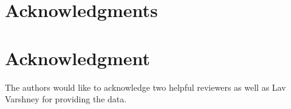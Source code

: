 \documentclass[10pt,journal,cspaper,compsoc]{IEEEtran}
\begin{document}
% 
% 
% 
%  
% 
% 





\ifCLASSOPTIONcompsoc
  \section*{Acknowledgments}
\else
  \section*{Acknowledgment}
\fi

The authors would like to acknowledge two helpful reviewers as well as Lav Varshney for providing the data.

\ifCLASSOPTIONcaptionsoff
  \newpage
\fi
\end{document}

